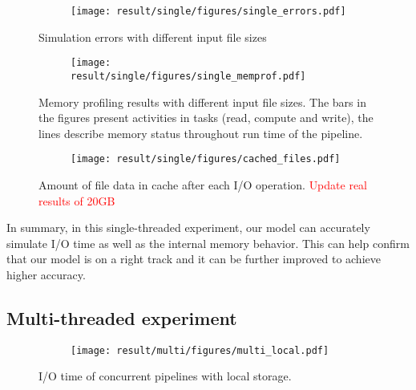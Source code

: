 \documentclass[conference]{IEEEtran}
\begin{document}
            \begin{figure*}
            \centering
            \begin{subfigure}{\linewidth}
                \centering
                   \texttt{[image: result/single/figures/single\_errors.pdf]}
            \end{subfigure}
            \caption{Simulation errors with different input file sizes}
            \label{fig:single_error}
            \begin{subfigure}{\linewidth}
                \centering
                   \texttt{[image: result/single/figures/single\_memprof.pdf]}
            \end{subfigure}
            \caption{Memory profiling results with different input file sizes.
            The bars in the figures present activities in tasks (read, compute and write),
            the lines describe memory status throughout run time of the pipeline.}
            \label{fig:single_memprof}
            \begin{subfigure}{\linewidth}
                \centering
                   \texttt{[image: result/single/figures/cached\_files.pdf]}
            \end{subfigure}
            \label{fig:single_cache}
               \caption{Amount of file data in cache after each I/O operation. 
               \textcolor{red}{Update real results of 20GB}}
            \end{figure*}

            In summary, in this single-threaded experiment, our model can accurately
            simulate I/O time as well as the internal memory behavior.
            This can help confirm that our model is on a right track and
            it can be further improved to achieve higher accuracy.

        \subsection{Multi-threaded experiment}

            \begin{figure*}
            \begin{subfigure}{\linewidth}
                \centering
                \texttt{[image: result/multi/figures/multi\_local.pdf]}
            \end{subfigure}
            \caption{I/O time of concurrent pipelines with local storage.}
            \label{fig:multi_local}
            \end{figure*}
\end{document}
